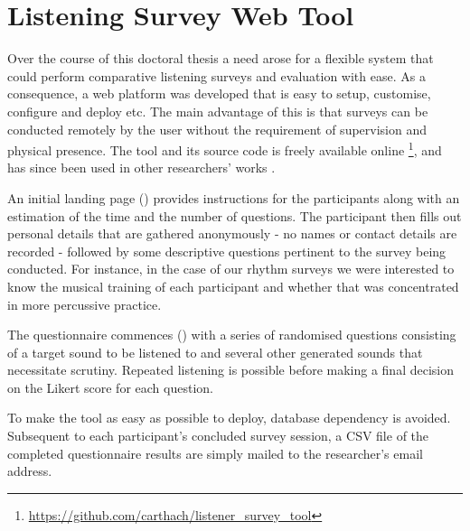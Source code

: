 
\chapter{Listening Survey Web Tool}\label{app:listening_survey}

Over the course of this doctoral thesis a need arose for a flexible system that could perform comparative listening surveys and evaluation with ease. As a consequence, a web platform was developed that is easy to setup, customise, configure and deploy etc. The main advantage of this is that surveys can be conducted remotely by the user without the requirement of supervision and physical presence. The tool and its source code is freely available online \footnote{\url{https://github.com/carthach/listener_survey_tool}}, and has since been used in other researchers' works \citep{Marti2015, Jade2016}.

An initial landing page () provides instructions for the participants along with an estimation of the time and the number of questions. The participant then fills out personal details that are gathered anonymously - no names or contact details are recorded - followed by some descriptive questions pertinent to the survey being conducted. For instance, in the case of our rhythm surveys we were interested to know the musical training of each participant and whether that was concentrated in more percussive practice.  

The questionnaire commences () with a series of randomised questions consisting of a target sound to be listened to and several other generated sounds that necessitate scrutiny. Repeated listening is possible before making a final decision on the Likert score for each question.

To make the tool as easy as possible to deploy, database dependency is avoided. Subsequent to each participant's concluded survey session, a CSV file of the completed questionnaire results are simply mailed to the researcher's email address.


